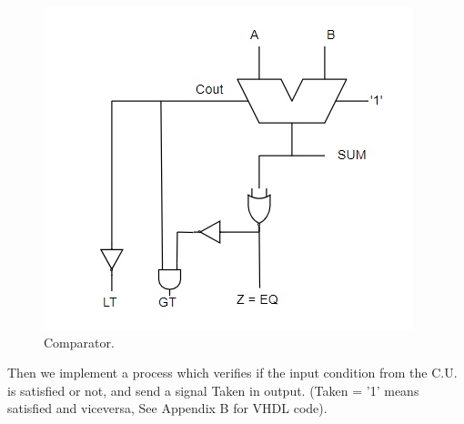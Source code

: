 \begin{figure}[!h]
\centering
\includegraphics[scale = 0.7]{chapters/figures/comparator} 
\caption{Comparator.}
\label{fig:comparator}  %
\end{figure}

\FloatBarrier

Then we implement a process which verifies if the input condition from the C.U. is satisfied or not, and send a signal Taken in output. 
(Taken = '1' means satisfied and viceversa, See Appendix B for VHDL code).





 